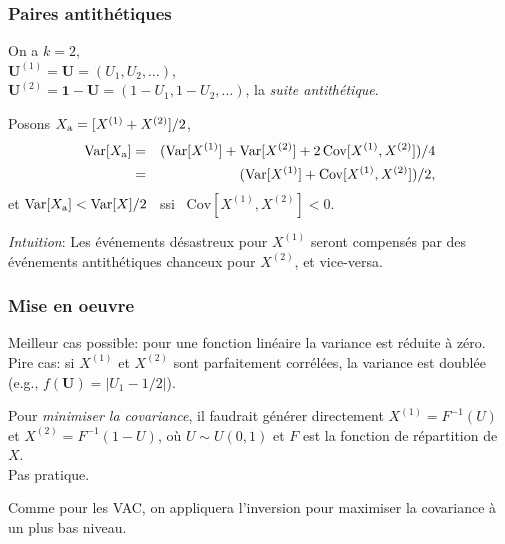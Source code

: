 \documentclass[t,usepdftitle=false]{beamer}
\def\bU{\boldsymbol{U}}
\def\bone{\boldsymbol{1}}
\def\q{\quad}
\def\Var{\mbox{Var}}
\def\Cov{\mbox{Cov}}
\begin{document}
\begin{frame}
\frametitle{Paires antithétiques}

On a ${k}=2$,\\
\q ${\bU^{(1)}} = \bU = (U_1,U_2,\dots)$, \\
\q ${\bU^{(2)}} = \bone -\bU = (1-U_1, 1-U_2, \dots)$, 
la \emph{suite antithétique}.

\mbox{}

Posons ${X_{\rm a}} = [X^{(1)} + X^{(2)}]/2$,
\begin{eqnarray*}
 {\Var[X_{\rm a}]}
    &=& {(\Var[X^{(1)}] + \Var[X^{(2)}] + 2 \, \Cov[X^{(1)}, X^{(2)}]) / 4} \\
    &=& {(\Var[X^{(1)}] + \Cov[X^{(1)}, X^{(2)}]) / 2},
\end{eqnarray*}
et $\Var[X_{\rm a}] < \Var[X]/2$ \ ssi \ $\Cov[X^{(1)}, X^{(2)}] < 0$.

\mbox{}

\emph{Intuition}:
Les événements désastreux pour $X^{(1)}$ seront compensés par
des événements antithétiques chanceux pour $X^{(2)}$, et vice-versa.



\end{frame}

\begin{frame}
\frametitle{Mise en oeuvre}
	
	Meilleur cas possible: pour une fonction lin\'eaire la variance est 
	r\'eduite \`a z\'ero.\\
	Pire cas: si $X^{(1)}$ et $X^{(2)}$ sont parfaitement corr\'el\'ees,
	la variance est doubl\'ee (e.g., $f(\bU) = |U_1-1/2|$).
	
	\mbox{}	
	
	Pour \emph{minimiser la covariance}, il faudrait g\'en\'erer
	directement ${X^{(1)}} = F^{-1}(U)$ et ${X^{(2)}} = F^{-1}(1-U)$, 
	o\`u $U \sim U(0,1)$ et $F$ est la fonction de r\'epartition de $X$.
		\\
		Pas pratique.
	
	\mbox{}
	
	Comme pour les VAC, on appliquera l'inversion pour maximiser 
	la covariance \`a un plus bas niveau.
	
	
\end{frame}
\end{document}
